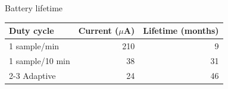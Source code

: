 \documentclass{beamer}
\begin{document}
\begin{frame}{Battery lifetime}
\centering
\begin{tabular}{lrr}
\toprule
Duty cycle & Current ($\mu$A) & Lifetime (months) \\
\midrule
1 sample/min  & 210 & 9 \\
1 sample/10 min & 38 & 31 \\
\cmidrule(lr){2-3}
Adaptive & 24 & 46 \\
\bottomrule
\end{tabular}
\end{frame}
\end{document}
